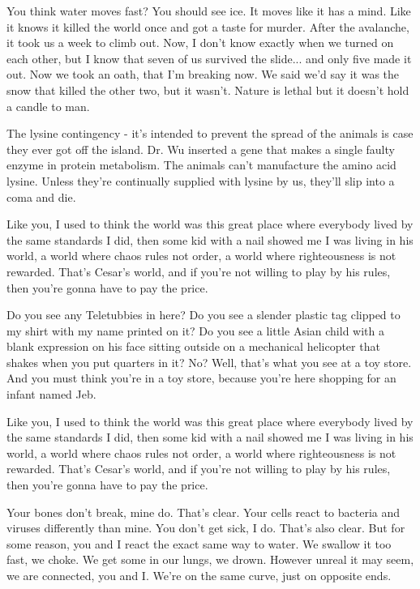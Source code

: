 \documentclass{book}
\begin{document}
You think water moves fast? You should see ice. It moves like it has a mind. Like it knows it killed the world once and got a taste for murder. After the avalanche, it took us a week to climb out. Now, I don't know exactly when we turned on each other, but I know that seven of us survived the slide... and only five made it out. Now we took an oath, that I'm breaking now. We said we'd say it was the snow that killed the other two, but it wasn't. Nature is lethal but it doesn't hold a candle to man.

The lysine contingency - it's intended to prevent the spread of the animals is case they ever got off the island. Dr. Wu inserted a gene that makes a single faulty enzyme in protein metabolism. The animals can't manufacture the amino acid lysine. Unless they're continually supplied with lysine by us, they'll slip into a coma and die.

Like you, I used to think the world was this great place where everybody lived by the same standards I did, then some kid with a nail showed me I was living in his world, a world where chaos rules not order, a world where righteousness is not rewarded. That's Cesar's world, and if you're not willing to play by his rules, then you're gonna have to pay the price.

Do you see any Teletubbies in here? Do you see a slender plastic tag clipped to my shirt with my name printed on it? Do you see a little Asian child with a blank expression on his face sitting outside on a mechanical helicopter that shakes when you put quarters in it? No? Well, that's what you see at a toy store. And you must think you're in a toy store, because you're here shopping for an infant named Jeb.

Like you, I used to think the world was this great place where everybody lived by the same standards I did, then some kid with a nail showed me I was living in his world, a world where chaos rules not order, a world where righteousness is not rewarded. That's Cesar's world, and if you're not willing to play by his rules, then you're gonna have to pay the price.

Your bones don't break, mine do. That's clear. Your cells react to bacteria and viruses differently than mine. You don't get sick, I do. That's also clear. But for some reason, you and I react the exact same way to water. We swallow it too fast, we choke. We get some in our lungs, we drown. However unreal it may seem, we are connected, you and I. We're on the same curve, just on opposite ends.
\end{document}
